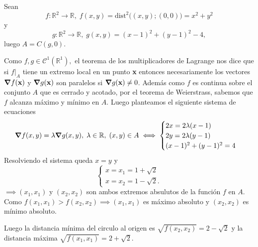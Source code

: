 \begin{solution}
    Sean
    \[
        f: \mathbb{R}^2 \rightarrow \mathbb{R}, \; f(x,y) = \text{dist}^2\Big((x,y);(0,0)\Big)  = x^2 + y^2
    \]
    y
    \[
        g: \mathbb{R}^2 \rightarrow \mathbb{R}, \; g(x,y) = (x-1)^2 + (y-1)^2 - 4,
    \]
    luego $A=C(g,0) $.

    Como $f,g \in \mathcal{C}^1( \mathbb{R}^1),$  el teorema de los multiplicadores de Lagrange nos dice que si $f \big\rvert _A$ tiene un extremo local en un punto \textbf{x} entonces necesariamente los vectores $\grad f(\textbf{x})$ y $\grad g(\textbf{x})$ son paralelos si $\grad g(\textbf{x}) \neq 0$.   Además como $f$ es continua sobre el conjunto $A$ que es cerrado y acotado, por el teorema de Weierstrass, sabemos que $f$ alcanza m\'aximo y m\'inimo en $A$. Luego planteamos el siguiente sistema de ecuaciones
    \[
        \grad f(x,y) = \lambda \grad g(x,y), \; \lambda \in \mathbb{R}, \; (x,y) \in A \\
        \iff \begin{cases}
            2x = 2\lambda(x-1) \\
            2y = 2\lambda(y-1) \\
            (x-1)^2 + (y-1)^2 = 4
        \end{cases}
    \]
    Resolviendo el sistema queda $x=y$  \;  y \[ \begin{cases}
            x=   x_1=1+\sqrt{2} \\
            x=  x_2=1-\sqrt{2}.
        \end{cases}\]
    $\implies (x_1,x_1)$  y $(x_2,x_2)$  son ambos extremos absulutos de la función $f$  en $A$. Como $f(x_1,x_1) > f(x_2,x_2) \implies (x_1,x_1)$ es máximo absoluto y $(x_2,x_2)$ es mínimo absoluto.

    Luego  la distancia mínima del circulo al origen es $\sqrt{f(x_2,x_2)} = 2-\sqrt{2} $ y la distancia máxima $\sqrt{f(x_1,x_1)} = 2+\sqrt{2}$.
\end{solution}

